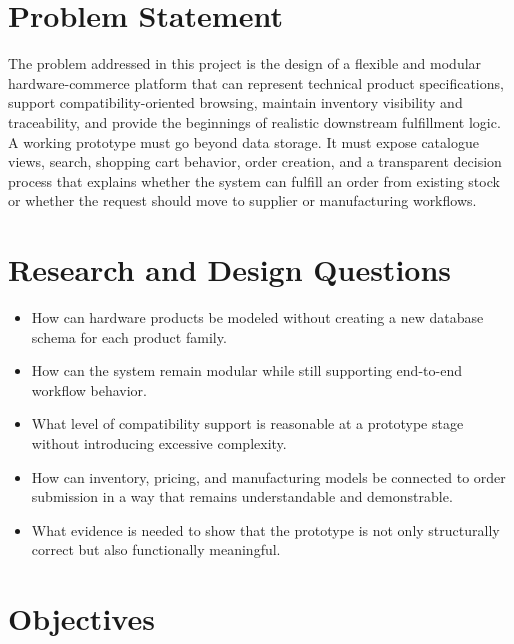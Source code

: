 \documentclass[12pt,letterpaper,oneside,openany]{book}
\begin{document}
\section{Problem Statement}

\begin{justifying}
The problem addressed in this project is the design of a flexible and modular
hardware-commerce platform that can represent technical product specifications,
support compatibility-oriented browsing, maintain inventory visibility and
traceability, and provide the beginnings of realistic downstream fulfillment
logic. A working prototype must go beyond data storage. It must expose
catalogue views, search, shopping cart behavior, order creation, and a
transparent decision process that explains whether the system can fulfill an
order from existing stock or whether the request should move to supplier or
manufacturing workflows.
\end{justifying}

\section{Research and Design Questions}

\begin{itemize}[leftmargin=0.4in]
    \item How can hardware products be modeled without creating a new database schema for each product family.
    \item How can the system remain modular while still supporting end-to-end workflow behavior.
    \item What level of compatibility support is reasonable at a prototype stage without introducing excessive complexity.
    \item How can inventory, pricing, and manufacturing models be connected to order submission in a way that remains understandable and demonstrable.
    \item What evidence is needed to show that the prototype is not only structurally correct but also functionally meaningful.
\end{itemize}

\section{Objectives}
\end{document}
